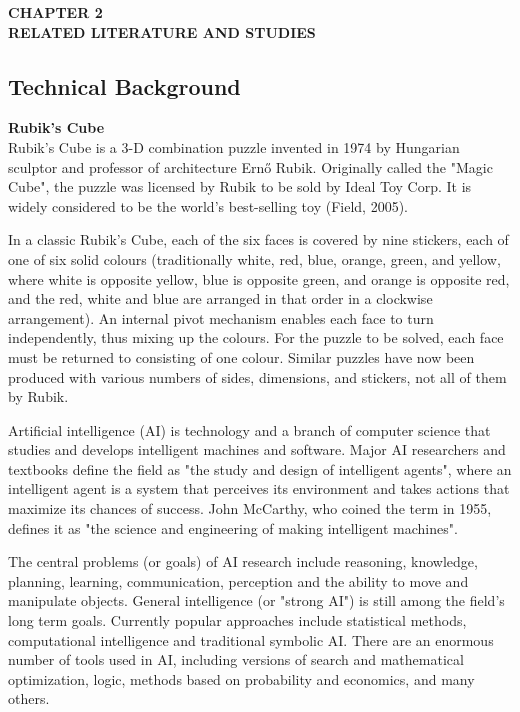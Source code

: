 \clearpage
\thispagestyle{empty}

\begin{center}
	\textbf{{CHAPTER 2}}\\
	\vspace{-1ex}
	\textbf{RELATED LITERATURE AND STUDIES}
	\vspace{-3ex}
\end{center}
\subsection{Technical Background}
\vspace{-2ex}
\noindent\textbf{Rubik's Cube}\\
\hspace*{1.5cm}Rubik's Cube is a 3-D combination puzzle invented in 1974 by Hungarian sculptor and professor of architecture Ernő Rubik.  Originally called the "Magic Cube", the puzzle was licensed by Rubik to be sold by Ideal Toy Corp.  It is widely considered to be the world's best-selling toy (Field, 2005). 

In a classic Rubik's Cube, each of the six faces is covered by nine stickers, each of one of six solid colours (traditionally white, red, blue, orange, green, and yellow, where white is opposite yellow, blue is opposite green, and orange is opposite red, and the red, white and blue are arranged in that order in a clockwise arrangement).  An internal pivot mechanism enables each face to turn independently, thus mixing up the colours.  For the puzzle to be solved, each face must be returned to consisting of one colour.  Similar puzzles have now been produced with various numbers of sides, dimensions, and stickers, not all of them by Rubik.

Artificial intelligence (AI) is technology and a branch of computer science that studies and develops intelligent machines and software.  Major AI researchers and textbooks define the field as "the study and design of intelligent agents", where an intelligent agent is a system that perceives its environment and takes actions that maximize its chances of success.  John McCarthy, who coined the term in 1955, defines it as "the science and engineering of making intelligent machines".

The central problems (or goals) of AI research include reasoning, knowledge, planning, learning, communication, perception and the ability to move and manipulate objects.  General intelligence (or "strong AI") is still among the field's long term goals.  Currently popular approaches include statistical methods, computational intelligence and traditional symbolic AI.  There are an enormous number of tools used in AI, including versions of search and mathematical optimization, logic, methods based on probability and economics, and many others.

